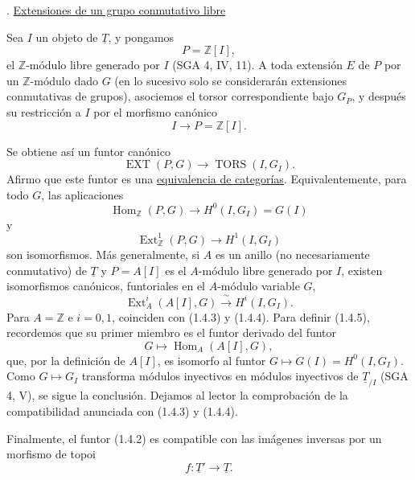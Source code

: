 \par\medskip{}. \underline{Extensiones de un grupo conmutativo libre}

Sea $I$ un objeto de $\underline T$, y pongamos
\begin{equation}\tag{1.4.1}
 P=\mathbb Z[I],
\end{equation}
el $\mathbb Z$-módulo libre generado por $I$ (SGA 4, IV, 11). A toda
extensión $E$ de $P$ por un $\mathbb Z$-módulo dado $G$ (en lo sucesivo
solo se considerarán extensiones conmutativas de grupos), asociemos el
torsor correspondiente bajo $G_P$, y después su restricción a $I$ por
el morfismo canónico
\[
 I\longrightarrow P=\mathbb Z[I].
\]


Se obtiene así un funtor canónico
\begin{equation}\tag{1.4.2}
 \operatorname{EXT}(P,G)\longrightarrow
 \operatorname{TORS}(I,G_I).
\end{equation}
Afirmo que este funtor es una \underline{equivalencia de categorías}.
Equivalentemente, para todo $G$, las aplicaciones
\begin{equation}\tag{1.4.3}
 \operatorname{Hom}_{\mathbb Z}(P,G)\longrightarrow
 H^0(I,G_I)=G(I)
\end{equation}
y
\begin{equation}\tag{1.4.4}
 \operatorname{Ext}^1_{\mathbb Z}(P,G)\longrightarrow H^1(I,G_I)
\end{equation}
son isomorfismos. Más generalmente, si $A$ es un anillo (no
necesariamente conmutativo) de $\underline T$ y $P=A[I]$ es el
$A$-módulo libre generado por $I$, existen isomorfismos canónicos,
funtoriales en el $A$-módulo variable $G$,
\begin{equation}\tag{1.4.5}
 \operatorname{Ext}^i_A(A[I],G)\xrightarrow{\ \sim\ }H^i(I,G_I).
\end{equation}
Para $A=\mathbb Z$ e $i=0,1$, coinciden con (1.4.3) y (1.4.4). Para
definir (1.4.5), recordemos que su primer miembro es el funtor derivado
del funtor
\[
 G\longmapsto\operatorname{Hom}_A(A[I],G),
\]
que, por la definición de $A[I]$, es isomorfo al funtor
$G\longmapsto G(I)=H^0(I,G_I)$. Como $G\longmapsto G_I$ transforma
módulos inyectivos en módulos inyectivos de $\underline T_{/I}$
(SGA 4, V), se sigue la conclusión. Dejamos al lector la comprobación
de la compatibilidad anunciada con (1.4.3) y (1.4.4).

Finalmente, el funtor (1.4.2) es compatible con las imágenes inversas
por un morfismo de topoi
\[
 f:\underline T'\longrightarrow\underline T.
\]
